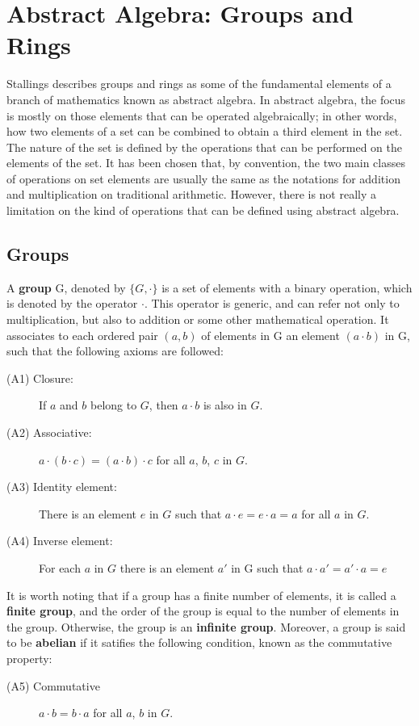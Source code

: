 \section{Abstract Algebra: Groups and Rings}

Stallings \cite{CryptoStallings} describes groups and rings as some of the fundamental elements of a branch of mathematics known as abstract algebra. In abstract algebra, the focus is mostly on those elements that can be operated algebraically; in other words, how two elements of a set can be combined to obtain a third element in the set. The nature of the set is defined by the operations that can be performed on the elements of the set. It has been chosen that, by convention, the two main classes of operations on set elements are usually the same as the notations for addition and multiplication on traditional arithmetic. However, there is not really a limitation on the kind of operations that can be defined using abstract algebra.

\subsection{Groups}

A \textbf{group} G, denoted by $\{ G, \cdot \}$ is a set of elements with a binary operation, which is denoted by the operator $\cdot$. This operator is generic, and can refer not only to multiplication, but also to addition or some other mathematical operation. It associates to each ordered pair $(a, b)$ of elements in G an element $(a \cdot b)$ in G, such that the following axioms are followed:
\begin{description}
  \item[(A1) Closure:] If $a$ and $b$ belong to $G$, then $a \cdot b$ is also in $G$.
  \item[(A2) Associative:] $a \cdot (b \cdot c) = (a \cdot b) \cdot c $ for all $a$, $b$, $c$ in $G$.
  \item[(A3) Identity element:] There is an element $e$ in $G$ such that $a \cdot e = e \cdot a = a$ for all $a$ in $G$.
  \item[(A4) Inverse element:] For each $a$ in $G$ there is an element $a'$ in G such that $a \cdot a' = a' \cdot a = e$ 
\end{description}
It is worth noting that if a group has a finite number of elements, it is called a \textbf{finite group}, and the order of the group is equal to the number of elements in the group. Otherwise, the group is an \textbf{infinite group}. Moreover, a group is said to be \textbf{abelian} if it satifies the following condition, known as the commutative property:
\begin{description}
  \item[(A5) Commutative] $a \cdot b = b \cdot a$ for all $a$, $b$ in $G$.
\end{description}

